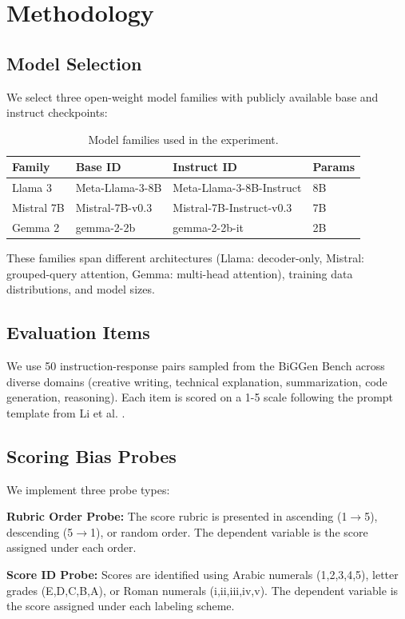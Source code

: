 \documentclass[11pt,twocolumn]{article}
\begin{document}
\section{Methodology}
\label{sec:methodology}

\subsection{Model Selection}
We select three open-weight model families with publicly available base and instruct checkpoints:

\begin{table}[h]
\centering
\caption{Model families used in the experiment.}
\label{tab:models}
\begin{tabular}{llll}
\toprule
Family & Base ID & Instruct ID & Params \\
\midrule
Llama 3 & Meta-Llama-3-8B & Meta-Llama-3-8B-Instruct & 8B \\
Mistral 7B & Mistral-7B-v0.3 & Mistral-7B-Instruct-v0.3 & 7B \\
Gemma 2 & gemma-2-2b & gemma-2-2b-it & 2B \\
\bottomrule
\end{tabular}
\end{table}

These families span different architectures (Llama: decoder-only, Mistral: grouped-query attention, Gemma: multi-head attention), training data distributions, and model sizes.

\subsection{Evaluation Items}
We use 50 instruction-response pairs sampled from the BiGGen Bench \cite{kim2024biggen} across diverse domains (creative writing, technical explanation, summarization, code generation, reasoning). Each item is scored on a 1-5 scale following the prompt template from Li et al. \cite{li2025scoring}.

\subsection{Scoring Bias Probes}
We implement three probe types:

\textbf{Rubric Order Probe:} The score rubric is presented in ascending (1$\to$5), descending (5$\to$1), or random order. The dependent variable is the score assigned under each order.

\textbf{Score ID Probe:} Scores are identified using Arabic numerals (1,2,3,4,5), letter grades (E,D,C,B,A), or Roman numerals (i,ii,iii,iv,v). The dependent variable is the score assigned under each labeling scheme.
\end{document}
